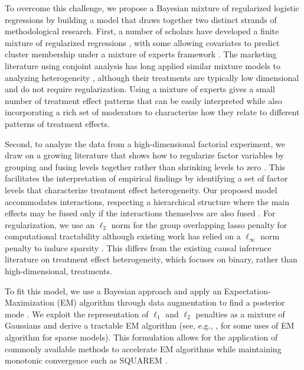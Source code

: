 To overcome this challenge, we propose a Bayesian mixture of
regularized logistic regressions by building a model that draws
together two distinct strands of methodological research.  First, a
number of scholars have developed a finite mixture of regularized
regressions \citep[e.g.,][]{khal:chen:07,stadler2010lasso}, with some
allowing covariates to predict cluster membership under a mixture of
experts framework \citep{khalili2010mixture}. The marketing literature
using conjoint analysis has long applied similar mixture models to
analyzing heterogeneity
\citep[e.g.,][]{gupta1994using,andrews2002empirical}, although their
treatments are typically low dimensional and do not require
regularization. Using a mixture of experts gives a small number of
treatment effect patterns that can be easily interpreted while also
incorporating a rich set of moderators to characterize how they relate
to different patterns of treatment effects.

Second, to analyze the data from a high-dimensional factorial
experiment, we draw on a growing literature that shows how to
regularize factor variables by grouping and fusing levels together
rather than shrinking levels to zero
\citep[e.g.,][]{bondell2009anova,post2013factor,stokell2021modelling}. This
facilitates the interpretation of empirical findings by identifying a
set of factor levels that characterize treatment effect heterogeneity.
Our proposed model accommodates interactions, respecting a
hierarchical structure where the main effects may be fused only if the
interactions themselves are also fused \citep{yan2017hierarchical}.
For regularization, we use an $\ell_2$ norm for the group overlapping
lasso penalty for computational tractability although existing work
has relied on a $\ell_\infty$ norm penalty to induce sparsity
\citep{post2013factor,egam:imai:19}.  This differs from the existing
causal inference literature on treatment effect heterogeneity, which focuses on binary, rather than high-dimensional,
treatments.

To fit this model, we use a Bayesian approach and apply an
Expectation-Maximization (EM) algorithm through data augmentation to
find a posterior mode \citep{demp:lair:rubi:77,meng:vand:97}.  We
exploit the representation of $\ell_1$ and $\ell_2$ penalties as a
mixture of Gaussians and derive a tractable EM algorithm
(see, e.g.,
\citealt{figueiredo2003adaptive,polson2011svm,ratkovic2017sparse,goplerud2021sparsity},
for some uses of EM algorithm for sparse models). This formulation
allows for the application of commonly available methods to accelerate EM algorithms
while maintaining monotonic convergence such as SQUAREM
\citep{varadhan2008simple}. 

